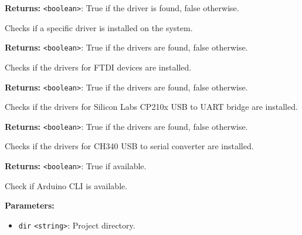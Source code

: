 \documentclass[12pt,a4paper]{article}
\begin{document}
\noindent \textbf{Returns:} \texttt{<boolean>}: True if the driver is found, false otherwise.

\noindent Checks if a specific driver is installed on the system.

\vspace{5mm}
\noindent {}


\noindent \textbf{Returns:} \texttt{<boolean>}: True if the drivers are found, false otherwise.

\noindent Checks if the drivers for FTDI devices are installed.

\vspace{5mm}
\noindent {}


\noindent \textbf{Returns:} \texttt{<boolean>}: True if the drivers are found, false otherwise.

\noindent Checks if the drivers for Silicon Labs CP210x USB to UART bridge are installed.

\vspace{5mm}
\noindent {}


\noindent \textbf{Returns:} \texttt{<boolean>}: True if the drivers are found, false otherwise.

\noindent Checks if the drivers for CH340 USB to serial converter are installed.

\vspace{5mm}
\noindent {}


\noindent \textbf{Returns:} \texttt{<boolean>}: True if available.

\noindent Check if Arduino CLI is available.

\vspace{5mm}
\noindent {}


\noindent \textbf{Parameters:}
\begin{itemize}
  \item \texttt{dir} \texttt{<string>}: Project directory.
\end{itemize}
\end{document}
